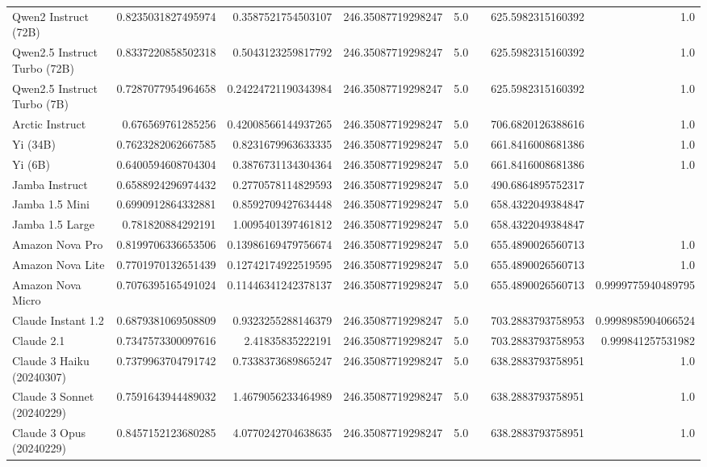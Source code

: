 \begin{table}[htp]
{\begin{tabular}{lrrrrrrr}
Qwen2 Instruct (72B) & 0.8235031827495974 & 0.3587521754503107 & 246.35087719298247 & 5.0 &  & 625.5982315160392 & 1.0 \\
Qwen2.5 Instruct Turbo (72B) & 0.8337220858502318 & 0.5043123259817792 & 246.35087719298247 & 5.0 &  & 625.5982315160392 & 1.0 \\
Qwen2.5 Instruct Turbo (7B) & 0.7287077954964658 & 0.24224721190343984 & 246.35087719298247 & 5.0 &  & 625.5982315160392 & 1.0 \\
Arctic Instruct & 0.676569761285256 & 0.42008566144937265 & 246.35087719298247 & 5.0 &  & 706.6820126388616 & 1.0 \\
Yi (34B) & 0.7623282062667585 & 0.8231679963633335 & 246.35087719298247 & 5.0 &  & 661.8416008681386 & 1.0 \\
Yi (6B) & 0.6400594608704304 & 0.3876731134304364 & 246.35087719298247 & 5.0 &  & 661.8416008681386 & 1.0 \\
Jamba Instruct & 0.6588924296974432 & 0.2770578114829593 & 246.35087719298247 & 5.0 &  & 490.6864895752317 &  \\
Jamba 1.5 Mini & 0.6990912864332881 & 0.8592709427634448 & 246.35087719298247 & 5.0 &  & 658.4322049384847 &  \\
Jamba 1.5 Large & 0.781820884292191 & 1.0095401397461812 & 246.35087719298247 & 5.0 &  & 658.4322049384847 &  \\
Amazon Nova Pro & 0.8199706336653506 & 0.13986169479756674 & 246.35087719298247 & 5.0 &  & 655.4890026560713 & 1.0 \\
Amazon Nova Lite & 0.7701970132651439 & 0.12742174922519595 & 246.35087719298247 & 5.0 &  & 655.4890026560713 & 1.0 \\
Amazon Nova Micro & 0.7076395165491024 & 0.11446341242378137 & 246.35087719298247 & 5.0 &  & 655.4890026560713 & 0.9999775940489795 \\
Claude Instant 1.2 & 0.6879381069508809 & 0.9323255288146379 & 246.35087719298247 & 5.0 &  & 703.2883793758953 & 0.9998985904066524 \\
Claude 2.1 & 0.7347573300097616 & 2.41835835222191 & 246.35087719298247 & 5.0 &  & 703.2883793758953 & 0.999841257531982 \\
Claude 3 Haiku (20240307) & 0.7379963704791742 & 0.7338373689865247 & 246.35087719298247 & 5.0 &  & 638.2883793758951 & 1.0 \\
Claude 3 Sonnet (20240229) & 0.7591643944489032 & 1.4679056233464989 & 246.35087719298247 & 5.0 &  & 638.2883793758951 & 1.0 \\
Claude 3 Opus (20240229) & 0.8457152123680285 & 4.0770242704638635 & 246.35087719298247 & 5.0 &  & 638.2883793758951 & 1.0 \\

\end{tabular}}
\end{table}
